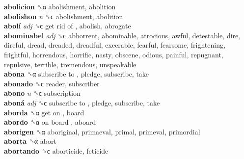 \textbf{abolicion} ␝α  abolishment, abolition  \\
\textbf{abolishon} \emph{n}  ␝ϲ  abolishment, abolition  \\
\textbf{abolí} \emph{adj}  ␝ϲ   get rid of , abolish, abrogate  \\
\textbf{abominabel} \emph{adj}  ␝ϲ  abhorrent, abominable, atrocious, awful, detestable, dire, direful, dread, dreaded, dreadful, execrable, fearful, fearsome, frightening, frightful, horrendous, horrific, nasty, obscene, odious, painful, repugnant, repulsive, terrible, tremendous, unspeakable  \\
\textbf{abona} ␝α   subscribe to , pledge, subscribe, take  \\
\textbf{abonado} ␝ϲ  reader, subscriber  \\
\textbf{abono} \emph{n}  ␝ϲ  subscription  \\
\textbf{aboná} \emph{adj}  ␝ϲ   subscribe to , pledge, subscribe, take  \\
\textbf{aborda} ␝α   get on , board  \\
\textbf{abordo} ␝α   on board , aboard  \\
\textbf{aborigen} ␝α  aboriginal, primaeval, primal, primeval, primordial  \\
\textbf{aborta} ␝α  abort  \\
\textbf{abortando} ␝ϲ  aborticide, feticide  \\
